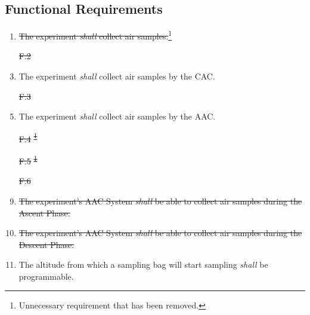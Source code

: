 \documentclass[a4paper,12pt,twoside, final]{article}
\providecommand{\DIFaddtex}[1]{{\protect\color{blue}\uwave{#1}}} %
\providecommand{\DIFdeltex}[1]{{\protect\color{red}\sout{#1}}}                      %
\providecommand{\DIFaddbegin}{} %
\providecommand{\DIFaddend}{} %
\providecommand{\DIFdelbegin}{} %
\providecommand{\DIFdelend}{} %
\providecommand{\DIFadd}[1]{\texorpdfstring{\DIFaddtex{#1}}{#1}} %
\providecommand{\DIFdel}[1]{\texorpdfstring{\DIFdeltex{#1}}{}} %
\newcommand{\DIFscaledelfig}{0.5}
\newlength{\DIFdelgraphicswidth} %
\newlength{\DIFdelgraphicsheight} %
\newcommand{\DIFaddincludegraphics}[2][]{{\color{blue}\fbox{\DIFOincludegraphics[#1]{#2}}}} %
\newcommand{\DIFdelincludegraphics}[2][]{%
\sbox{\DIFdelgraphicsbox}{\DIFOincludegraphics[#1]{#2}}%
\settoboxwidth{\DIFdelgraphicswidth}{\DIFdelgraphicsbox} %
\settoboxtotalheight{\DIFdelgraphicsheight}{\DIFdelgraphicsbox} %
\scalebox{\DIFscaledelfig}{%
\parbox[b]{\DIFdelgraphicswidth}{\usebox{\DIFdelgraphicsbox}\\[-\baselineskip] \rule{\DIFdelgraphicswidth}{0em}}\llap{\resizebox{\DIFdelgraphicswidth}{\DIFdelgraphicsheight}{%
\setlength{\unitlength}{\DIFdelgraphicswidth}%
\begin{picture}(1,1)%
\thicklines\linethickness{2pt} %
{\color[rgb]{1,0,0}\put(0,0){\framebox(1,1){}}}%
{\color[rgb]{1,0,0}\put(0,0){\line( 1,1){1}}}%
{\color[rgb]{1,0,0}\put(0,1){\line(1,-1){1}}}%
\end{picture}%
}\hspace*{3pt}}} %
} %
\DeclareRobustCommand{\DIFaddbegin}{\DIFOaddbegin \let\includegraphics\DIFaddincludegraphics} %
\DeclareRobustCommand{\DIFaddend}{\DIFOaddend \let\includegraphics\DIFOincludegraphics} %
\DeclareRobustCommand{\DIFdelbegin}{\DIFOdelbegin \let\includegraphics\DIFdelincludegraphics} %
\DeclareRobustCommand{\DIFdelend}{\DIFOaddend \let\includegraphics\DIFOincludegraphics} %
\begin{document}
\DIFdelend \subsection{Functional Requirements}

\DIFdelbegin %
\DIFdelend \DIFaddbegin \begin{enumerate}[label=F.\arabic*]
    \item \DIFaddend \st{The experiment \textit{shall} collect air samples.}\footnote{Unnecessary requirement that has been removed.\label{fn:unnecessary-requirement}}
    \DIFdelbegin %
\item[\DIFdel{F.2}]%
\DIFdelend \DIFaddbegin \item \DIFaddend The experiment \textit{shall} collect air samples by the CAC.
    \DIFdelbegin %
\item[\DIFdel{F.3}]%
\DIFdelend \DIFaddbegin \item \DIFaddend The experiment \textit{shall} collect air samples by the AAC.
    \DIFdelbegin %
\item[\DIFdel{F.4}]%
\DIFdel{\textsuperscript{\ref{fn:unnecessary-requirement}}
    }%
\item[\DIFdel{F.5}]%
\DIFdel{\textsuperscript{\ref{fn:unnecessary-requirement}}
    }%
\item[\DIFdel{F.6}]%
\DIFdelend \DIFaddbegin \item \st{The experiment's AAC System \textit{shall} be able to collect air samples during the Ascent Phase.}\DIFadd{\textsuperscript{\ref{fn:unnecessary-requirement}}
    }\item \st{The experiment's AAC System \textit{shall} be able to collect air samples during the Descent Phase.}\DIFadd{\textsuperscript{\ref{fn:unnecessary-requirement}}
    }\item \DIFaddend The altitude from which a sampling bag will start sampling \textit{shall} be programmable.

\end{enumerate}
\end{document}
